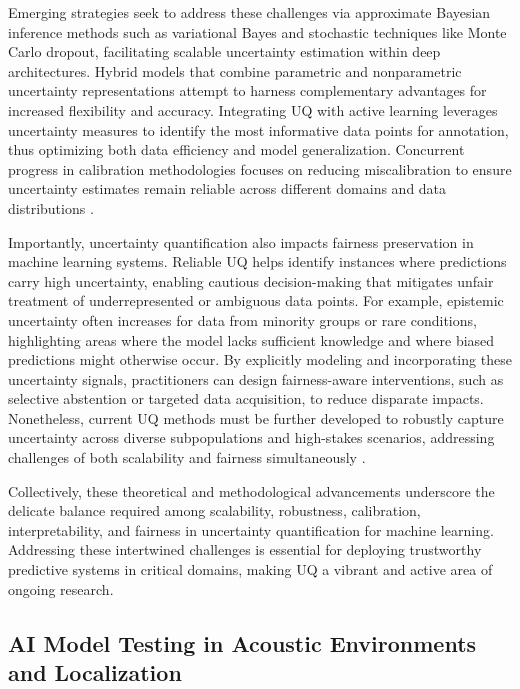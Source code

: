 \documentclass[sigconf]{acmart}
\begin{document}
Emerging strategies seek to address these challenges via approximate Bayesian inference methods such as variational Bayes and stochastic techniques like Monte Carlo dropout, facilitating scalable uncertainty estimation within deep architectures. Hybrid models that combine parametric and nonparametric uncertainty representations attempt to harness complementary advantages for increased flexibility and accuracy. Integrating UQ with active learning leverages uncertainty measures to identify the most informative data points for annotation, thus optimizing both data efficiency and model generalization. Concurrent progress in calibration methodologies focuses on reducing miscalibration to ensure uncertainty estimates remain reliable across different domains and data distributions \cite{ref28}.

Importantly, uncertainty quantification also impacts fairness preservation in machine learning systems. Reliable UQ helps identify instances where predictions carry high uncertainty, enabling cautious decision-making that mitigates unfair treatment of underrepresented or ambiguous data points. For example, epistemic uncertainty often increases for data from minority groups or rare conditions, highlighting areas where the model lacks sufficient knowledge and where biased predictions might otherwise occur. By explicitly modeling and incorporating these uncertainty signals, practitioners can design fairness-aware interventions, such as selective abstention or targeted data acquisition, to reduce disparate impacts. Nonetheless, current UQ methods must be further developed to robustly capture uncertainty across diverse subpopulations and high-stakes scenarios, addressing challenges of both scalability and fairness simultaneously \cite{ref28}.

Collectively, these theoretical and methodological advancements underscore the delicate balance required among scalability, robustness, calibration, interpretability, and fairness in uncertainty quantification for machine learning. Addressing these intertwined challenges is essential for deploying trustworthy predictive systems in critical domains, making UQ a vibrant and active area of ongoing research.

\subsection{AI Model Testing in Acoustic Environments and Localization}
\end{document}
